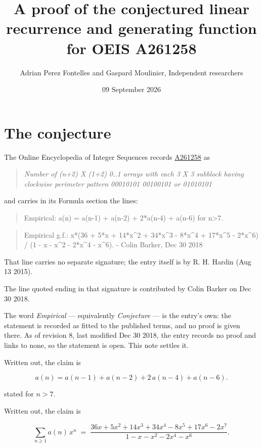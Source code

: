 \documentclass[11pt]{article}
\title{A proof of the conjectured linear recurrence and generating function for OEIS A261258}
\author{Adrian Perez Fontelles and Gaspard Moulinier, Independent researchers}
\date{09 September 2026}
\theoremstyle{definition}
\begin{document}
\maketitle
\section{The conjecture}

The Online Encyclopedia of Integer Sequences records \href{https://oeis.org/A261258}{A261258} as

\begin{quote}\itshape Number of (n+2) X (1+2) 0..1 arrays with each 3 X 3 subblock having clockwise perimeter pattern 00010101 00100101 or 01010101\end{quote}

and carries in its Formula section the lines:

\begin{quote}\ttfamily Empirical: a(n) = a(n-1) + a(n-2) + 2*a(n-4) + a(n-6) for n>7.\end{quote}

\begin{quote}\ttfamily Empirical g.f.: x*(36 + 5*x + 14*x\textasciicircum{}2 + 34*x\textasciicircum{}3 - 8*x\textasciicircum{}4 + 17*x\textasciicircum{}5 - 2*x\textasciicircum{}6) / (1 - x - x\textasciicircum{}2 - 2*x\textasciicircum{}4 - x\textasciicircum{}6). - Colin Barker, Dec 30 2018\end{quote}

That line carries no separate signature; the entry itself is by R. H. Hardin (Aug 13 2015).

The line quoted ending in that signature is contributed by Colin Barker on Dec 30 2018.

The word {\itshape Empirical} --- equivalently {\itshape Conjecture} --- is the entry's own: the statement is recorded as fitted to the published terms, and no proof is given there. As of revision 8, last modified Dec 30 2018, the entry records no proof and links to none, so the statement is open. This note settles it.

Written out, the claim is

\[a(n) = a(n-1) + a(n-2) + 2\,a(n-4) + a(n-6).\]

stated for $n > 7$.

Written out, the claim is

\[\sum_{n \ge 1} a(n)\,x^n \;=\; \frac{36x + 5x^{2} + 14x^{3} + 34x^{4} - 8x^{5} + 17x^{6} - 2x^{7}}{1 - x - x^{2} - 2x^{4} - x^{6}}.\]
\end{document}

